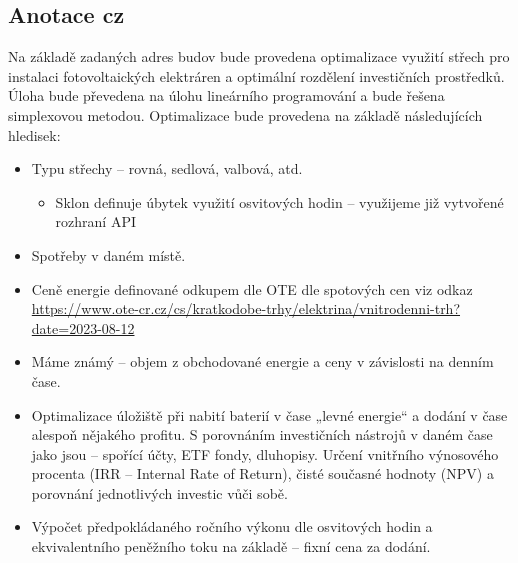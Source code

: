 \documentclass[a4paper, 12pt]{article}
\begin{document}
\subsection*{Anotace cz}
Na základě zadaných adres budov bude provedena optimalizace využití střech pro instalaci fotovoltaických elektráren a optimální rozdělení investičních prostředků. Úloha bude převedena na úlohu lineárního programování a bude řešena simplexovou metodou. Optimalizace bude provedena na základě následujících hledisek:
\begin{itemize}

    \item Typu střechy – rovná, sedlová, valbová, atd.
          \begin{itemize}
              \item Sklon definuje úbytek využití osvitových hodin – využijeme již vytvořené rozhraní API
          \end{itemize}
    \item Spotřeby v daném místě.
    \item Ceně energie definované odkupem dle OTE dle spotových cen viz odkaz \url{https://www.ote-cr.cz/cs/kratkodobe-trhy/elektrina/vnitrodenni-trh?date=2023-08-12}
    \item Máme známý – objem z obchodované energie a ceny v závislosti na denním čase.
    \item Optimalizace úložiště při nabití baterií v čase „levné energie“ a dodání v čase alespoň nějakého profitu. S porovnáním investičních nástrojů v daném čase jako jsou – spořící účty, ETF fondy, dluhopisy. Určení vnitřního výnosového procenta (IRR – Internal Rate of Return), čisté současné hodnoty (NPV) a porovnání jednotlivých investic vůči sobě.
    \item Výpočet předpokládaného ročního výkonu dle osvitových hodin a ekvivalentního peněžního toku na základě – fixní cena za dodání.

\end{itemize}
\end{document}
